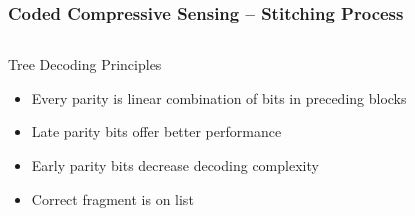 \documentclass[10pt]{beamer}
\begin{document}
\begin{frame}
\frametitle{Coded Compressive Sensing -- Stitching Process}
  \begin{center}
  
  \end{center}
\begin{columns}
\begin{block}{Tree Decoding Principles}
  \begin{itemize}
  \item Every parity is linear combination of bits in preceding blocks
  \item Late parity bits offer better performance
  \item Early parity bits decrease decoding complexity
  \item Correct fragment is on list
  \end{itemize}
\end{block}
  \centerline{\scalebox{0.5}{}}
\end{columns}
\end{frame}
\end{document}
